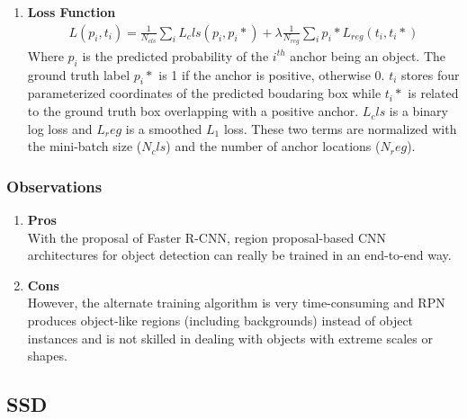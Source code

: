 \begin{enumerate}
\begin{itemize}
                    \end{itemize}
                \item \textbf{Loss Function}
                    \begin{align}
                        L(p_i, t_i) = \frac{1}{N_{cls}} \displaystyle\sum_i L_cls(p_i,p_i\ast) + \lambda \frac{1}{N_{reg}} \displaystyle\sum_i p_i\ast L_{reg} (t_i, t_i\ast)   
                    \end{align}
                    \vspace{3mm}
                    Where $p_i$ is the predicted probability of the $i^{th}$ anchor being an object. The ground truth label $p_i\ast$ is 1 if the anchor is positive, otherwise 0. $t_i$ stores four parameterized coordinates of the predicted boudaring box while $t_i\ast$ is related to the ground truth box overlapping with a positive anchor. $L_cls$ is a binary log loss and $L_reg$ is a smoothed $L_1$ loss. These two terms are normalized with the mini-batch size ($N_cls$) and the number of anchor locations ($N_reg$).
            \end{enumerate}
        \subsubsection{Observations}
            \begin{enumerate}
                \item \textbf{Pros} \\
                    \vspace{3mm}
                    With the proposal of Faster R-CNN, region proposal-based CNN architectures for object detection can really be trained in an end-to-end way.
                \item \textbf{Cons} \\
                    \vspace{3mm}
                    However, the alternate training algorithm is very time-consuming and RPN produces object-like regions (including backgrounds) instead of object instances and is not skilled in dealing with objects with extreme scales or shapes.
            \end{enumerate}

    \subsection{SSD}
